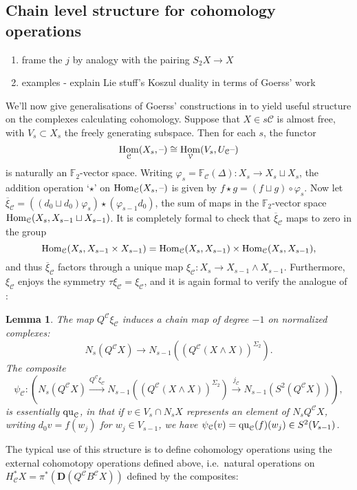 \documentclass[11pt]{amsart}
\theoremstyle{plain}
\newtheorem{lem}[thm]{Lemma}
\theoremstyle{definition}
\DeclareMathOperator{\Hom}{Hom}
\newcommand{\DASH}{\textup{--}}
\let\phi\varphi
\renewcommand{\to}{\longrightarrow}
\newcommand{\calC}{\mathcal{C}}
\newcommand{\calV}{\mathcal{V}}
\theoremstyle{plain}
\newcommand{\quadratic}{\textup{qu}}
\newcommand{\F}{\mathbb{F}}
\newcommand{\dual}{\mathbf{D}}
\begin{document}
\begin{Constructing homotopy and cohomotopy operations}
\subsection{Chain level structure for cohomology operations}
\hfil
\begin{shaded}
\begin{enumerate}
\item frame the $j$ by analogy with the pairing $S_2X\to X$
\item examples - explain Lie stuff's Koszul duality in terms of Goerss' work
\end{enumerate}
\end{shaded}


We'll now give generalisations of Goerss' constructions in \cite[\S5]{MR1089001} to yield useful structure on the complexes calculating cohomology.  Suppose that $X\in s\calC$ is almost free, with $V_s\subset X_s$ the freely generating subspace. Then for each $s$, the functor 
\[\Hom_\calC(X_s,\DASH)\cong \Hom_\calV(V_s,U_\calC\DASH)\]
is naturally an $\F_2$-vector space. Writing $\phi_s=\F_\calC(\Delta):X_s\to X_s\sqcup X_s$, the addition operation `$\star$' on $\Hom_\calC(X_s,\DASH)$ is given by $f\star g= (f\sqcup g)\circ\phi_s$. Now let
$\overline{\xi}_\calC=((d_0\sqcup d_0)\phi_s)\star(\phi_{s-1}d_0)$, the sum of maps in the $\F_2$-vector space $\textup{Hom}_\calC(X_s,X_{s-1}\sqcup X_{s-1})$. It is completely formal to check that $\overline{\xi}_\calC$ maps to zero in the group
\[\textup{Hom}_\calC(X_s,X_{s-1}\times X_{s-1})=\textup{Hom}_\calC(X_s,X_{s-1})\times \textup{Hom}_\calC(X_s,X_{s-1}),\]
and thus $\overline{\xi}_\calC$ factors through a unique map $\xi_\calC:X_s\to X_{s-1}\wedge X_{s-1}$. Furthermore, $\xi_\calC$ enjoys the symmetry $\tau\xi_\calC=\xi_\calC$, and it is again formal to verify the analogue of \cite[Lemma 5.5]{MR1089001}:
\begin{lem}\label{psi is basically the quadratic part}
The map $Q^\calC\xi_\calC$ induces a chain map of degree $-1$ on normalized complexes:
\[N_s(Q^{\calC}X)\to N_{s-1}((Q^{\calC}(X\wedge X))^{\Sigma_2}).\]
The composite
\[\psi_\calC:\left(N_s(Q^{\calC}X)\overset{Q^\calC\xi_\calC}{\to} N_{s-1}((Q^{\calC}(X\wedge X))^{\Sigma_2})\overset{j_\calC}{\to} N_{s-1}(S^2(Q^{\calC}X))\right),\]
is essentially $\quadratic_\calC$, in that if $v\in V_s\cap N_sX$ represents an element of $N_sQ^\calC X$, writing $d_0v=f(w_j)$ for $w_j\in V_{s-1}$, we have $\psi_\calC(v)=\quadratic_\calC(f)(w_j)\in S^2(V_{s-1})$.
\end{lem}
The typical use of this structure is to define cohomology operations using the external cohomotopy operations defined above, i.e.\ natural operations on $H^*_\calC X=\pi^*(\dual(Q^\calC B^\calC X))$ defined by the composites:

\end{Constructing homotopy and cohomotopy operations}
\end{document}
